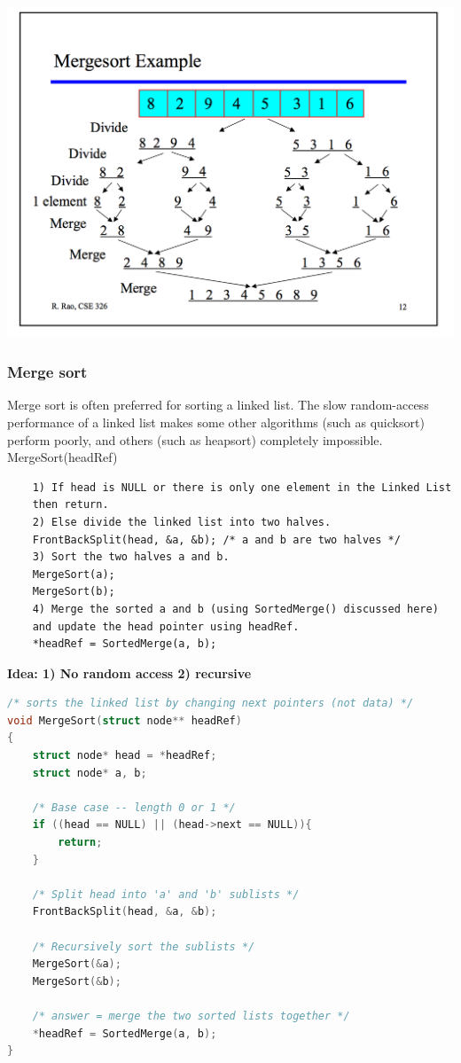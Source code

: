 \documentclass[a4paper,11pt,twoside]{book}
\begin{document}
\begin{center}
	\includegraphics[scale=0.45]{pics/merge_sort.png}
\end{center}




\subsubsection{Merge sort}

	\par Merge sort is often preferred for sorting a linked list. The slow random-access performance of a linked list makes some other algorithms (such as quicksort) perform poorly, and others (such as heapsort) completely impossible. MergeSort(headRef)
	
\begin{verbatim}
	1) If head is NULL or there is only one element in the Linked List 
	then return.
	2) Else divide the linked list into two halves.  
	FrontBackSplit(head, &a, &b); /* a and b are two halves */
	3) Sort the two halves a and b.
	MergeSort(a);
	MergeSort(b);
	4) Merge the sorted a and b (using SortedMerge() discussed here) 
	and update the head pointer using headRef.
	*headRef = SortedMerge(a, b);
\end{verbatim}
\textbf{Idea: 1) No random access 2) recursive}

\begin{lstlisting}[frame=single, language=c++] 
/* sorts the linked list by changing next pointers (not data) */
void MergeSort(struct node** headRef)
{
	struct node* head = *headRef;
	struct node* a, b;
	
	/* Base case -- length 0 or 1 */
	if ((head == NULL) || (head->next == NULL)){
		return;
	}
	
	/* Split head into 'a' and 'b' sublists */
	FrontBackSplit(head, &a, &b); 
	
	/* Recursively sort the sublists */
	MergeSort(&a);
	MergeSort(&b);
	
	/* answer = merge the two sorted lists together */
	*headRef = SortedMerge(a, b);
}		
\end{lstlisting}
\end{document}
